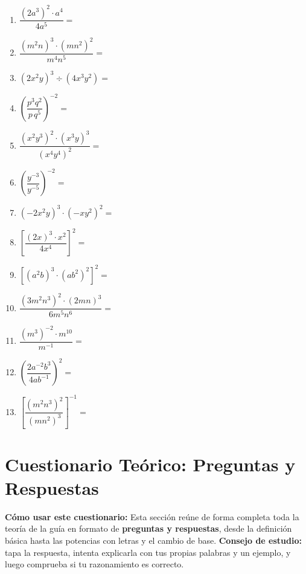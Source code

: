 \documentclass[12pt, letterpaper]{article}
\begin{document}
\begin{enumerate}[leftmargin=*, start=149]
  \item \dificil{} $\dfrac{(2a^3)^2 \cdot a^4}{4a^5} =$

  \item \dificil{} $\dfrac{(m^2n)^3 \cdot (mn^2)^2}{m^4n^5} =$

  \item \dificil{} $(2x^2y)^3 \div \left(4x^3y^2\right) =$

  \item \dificil{} $\left(\dfrac{p^3q^2}{p\,q^5}\right)^{-2} =$

  \item \dificil{} $\dfrac{(x^2y^3)^2 \cdot (x^3y)^3}{(x^4y^4)^2} =$

  \item \dificil{} $\left(\dfrac{y^{-3}}{y^{-5}}\right)^{-2} =$

  \item \dificil{} $(-2x^2y)^3 \cdot (-xy^2)^2 =$

  \item \dificil{} $\left[\dfrac{(2x)^3 \cdot x^2}{4x^4}\right]^2 =$

  \item \muyDificil{} $\left[(a^2b)^3 \cdot (ab^2)^2\right]^2 =$

  \item \muyDificil{} $\dfrac{(3m^2n^3)^2 \cdot (2mn)^3}{6m^5n^6} =$

  \item \muyDificil{} $\dfrac{(m^3)^{-2} \cdot m^{10}}{m^{-1}} =$

  \item \muyDificil{} $\left(\dfrac{2a^{-2}b^3}{4ab^{-1}}\right)^{2} =$

  \item \muyDificil{} $\left[\dfrac{(m^2n^3)^2}{(mn^2)^3}\right]^{-1} =$
\end{enumerate}

\newpage

\section{Cuestionario Teórico: Preguntas y Respuestas}

\begin{cuadroinfo}
  \small
  \textbf{Cómo usar este cuestionario:} Esta sección reúne de forma completa toda la teoría de la guía en formato de \textbf{preguntas y respuestas}, desde la definición básica hasta las potencias con letras y el cambio de base. \textbf{Consejo de estudio:} tapa la respuesta, intenta explicarla con tus propias palabras y un ejemplo, y luego comprueba si tu razonamiento es correcto.
\end{cuadroinfo}
\end{document}
